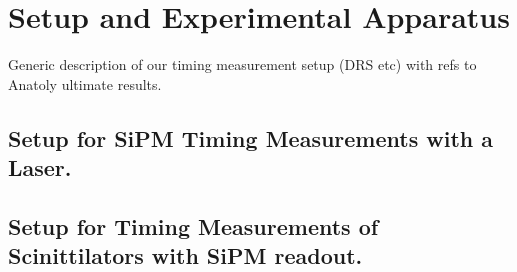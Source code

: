 \section{Setup and Experimental Apparatus }
\label{sec:tbeam}

Generic description of our timing measurement setup (DRS etc) with refs to Anatoly ultimate results.

\subsection{Setup for SiPM Timing Measurements with a Laser.}


\subsection{Setup for Timing Measurements of Scinittilators with SiPM readout.}
